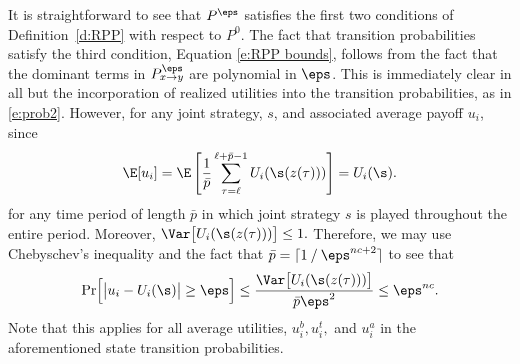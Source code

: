 It is straightforward to see that $P^\eps$ satisfies the first two conditions of Definition~\ref{d:RPP} with respect to $P^0$. The fact that transition probabilities satisfy the third condition, Equation \eqref{e:RPP bounds}, follows from the fact that the dominant terms in $P^\eps_{x\to y}$ are polynomial in $\eps$. This is immediately clear in all but the incorporation of realized utilities into the transition probabilities, as in \eqref{e:prob2}. However, for any joint strategy, $s$, and associated average payoff $u_i$, since 
$$\E[u_i] = \E\left[{1\over\bar{p}}\sum_{\tau = \ell}^{\ell+\bar{p}-1} U_i(\s(z(\tau)))\right] = U_i(\s).  $$
for any time period of length $\bar{p}$ in which joint strategy $s$ is played throughout the entire period. Moreover,  
$\Var\bigl[U_i(\s(z(\tau)))\bigr] \leq 1.$ Therefore, we may use Chebyschev's inequality and the fact that  $\bar{p} = \lceil  1\mathbin{/} \eps^{nc+2}  \rceil$ to see that
\begin{equation}\label{e:old claim}
\Pr \Bigl[\bigl| u_i - U_i(\s)\bigr|\geq \eps\Bigr] \leq { \Var\bigl[U_i(\s(z(\tau)))\bigr]\over \bar{p} \eps^2}\leq \eps^{nc}.
\end{equation} 
Note that this applies for all average utilities, $u_i^b, u_i^t,$ and $u_i^a$ in the aforementioned state transition probabilities.

%


